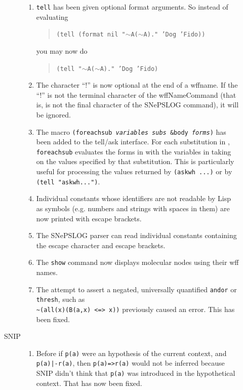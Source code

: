 \documentclass{book}
\newcommand{\cv}[1]{{\ttfamily{\itshape #1}}} %
\begin{document}
\begin{description}
\begin{description}
\begin{enumerate}
\item \texttt{tell} has been given optional format arguments.  So instead
     of evaluating
     \begin{quote}
     \texttt{(tell (format nil "\texttt{$\sim$A($\sim$A).}" 'Dog 'Fido))}
     \end{quote}
     you may now do
     \begin{quote}
     \texttt{(tell "\texttt{$\sim$A($\sim$A).}" 'Dog 'Fido)}
     \end{quote}

   \item The character ``!'' is now optional at the end of a wffname.  If the
     ``!''  is not the terminal character of the wffNameCommand (that is, is not
     the final character of the SNePSLOG command), it will be ignored.

   \item The macro \texttt{(foreachsub \textit{variables subs} \&body
       \textit{forms})} has been added to the tell/ask interface.  For each
     substitution in \cv{subs}, \texttt{foreachsub} evaluates the forms in
     \cv{forms} with the variables in \cv{variables} taking on the
     values specified by that substitution.  This is particularly useful for
     processing the values returned by \texttt{(askwh ...)}  or by \texttt{(tell
       "askwh...")}.
   \item Individual constants whose identifiers are not readable by Lisp as
     symbols (e.g. numbers and strings with spaces in them) are now printed with
     escape brackets.
   \item The SNePSLOG parser can read individual constants containing the escape
     character and escape brackets.
   \item The \texttt{show} command now displays molecular nodes using their wff
     names.
   \item The attempt to assert a negated, universally quantified \texttt{andor}
     or \texttt{thresh}, such as\\
     \verb|~|\texttt{(all(x)(B(a,x) <=> x))} previously
     caused an error.  This has been fixed.
    \end{enumerate}

  \item[SNIP]\mbox{}
    \begin{enumerate}
    \item Before if \texttt{p(a)} were an hypothesis of the current context, and
      \texttt{p(a)|-r(a)}, then \texttt{p(a)=>r(a)} would not be inferred
      because SNIP didn't think that \texttt{p(a)} was introduced in the
      hypothetical context.  That has now been fixed.
    \end{enumerate}


\end{description}
\end{description}
\end{document}
